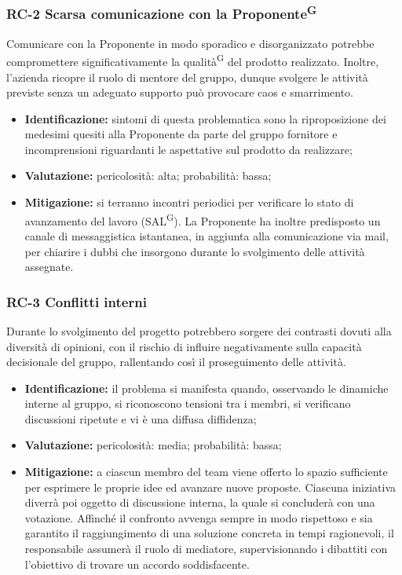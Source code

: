 \documentclass[8pt]{article}
\newcommand{\glossterm}[1]{#1\textsuperscript{G}} %
\begin{document}
\subsubsection{RC-2 Scarsa comunicazione con la \glossterm{Proponente}}
Comunicare con la Proponente in modo sporadico e disorganizzato potrebbe compromettere significativamente la \glossterm{qualità} del prodotto realizzato. Inoltre, l'azienda ricopre il ruolo di mentore del gruppo, dunque svolgere le attività previste senza un adeguato supporto può provocare caos e smarrimento.
\begin{itemize}
\setlength\itemsep{0em}
    \item \textbf{Identificazione:} sintomi di questa problematica sono la riproposizione dei medesimi quesiti alla Proponente da parte del gruppo fornitore e incomprensioni riguardanti le aspettative sul prodotto da realizzare;
    \item \textbf{Valutazione:} pericolosità: alta; probabilità: bassa;
    \item \textbf{Mitigazione:} si terranno incontri periodici per verificare lo stato di avanzamento del lavoro (\glossterm{SAL}). La Proponente ha inoltre predisposto un canale di messaggistica istantanea, in aggiunta alla comunicazione via mail, per chiarire i dubbi che insorgono durante lo svolgimento delle attività assegnate.
\end{itemize}
\subsubsection{RC-3 Conflitti interni}
Durante lo svolgimento del progetto potrebbero sorgere dei contrasti dovuti alla diversità di opinioni, con il rischio di influire negativamente sulla capacità decisionale del gruppo, rallentando così il proseguimento delle attività.
\begin{itemize}
\setlength\itemsep{0em}
    \item \textbf{Identificazione:} il problema si manifesta quando, osservando le dinamiche interne al gruppo, si riconoscono tensioni tra i membri, si verificano discussioni ripetute e vi è una diffusa diffidenza;
    \item \textbf{Valutazione:} pericolosità: media; probabilità: bassa;
    \item \textbf{Mitigazione:} a ciascun membro del team viene offerto lo spazio sufficiente per esprimere le proprie idee ed avanzare nuove proposte. Ciascuna iniziativa diverrà poi oggetto di discussione interna, la quale si concluderà con una votazione. Affinché il confronto avvenga sempre in modo rispettoso e sia garantito il raggiungimento di una soluzione concreta in tempi ragionevoli, il responsabile assumerà il ruolo di mediatore, supervisionando i dibattiti con l'obiettivo di trovare un accordo soddisfacente.
\end{itemize}
\end{document}
